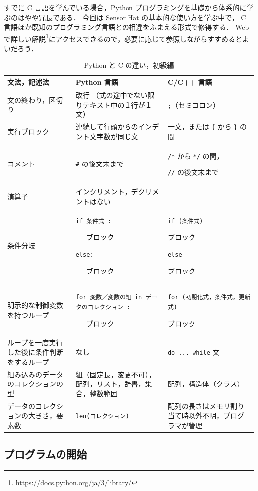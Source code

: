 \documentclass[11pt,a4,epsf]{report}
\begin{document}
すでに C 言語を学んでいる場合，Python プログラミングを基礎から体系的に学ぶのはやや冗長である．
今回は Sensor Hat の基本的な使い方を学ぶ中で， C 言語ほか既知のプログラミング言語との相違をふまえる形式で修得する．
Web で詳しい解説\footnote{\sf https://docs.python.org/ja/3/library/}にアクセスできるので，必要に応じて参照しながらすすめるとよいだろう．

\begin{table}[h]
\caption{Python と C の違い，初級編}
  \begin{tabular}{|p{1.5in}|p{2in}|p{2in}|}
\hline
文法，記述法 & Python 言語 & C/C++ 言語 \\
\hline
\hline
文の終わり，区切り & 改行 （式の途中でない限りテキスト中の１行が１文） & \verb+;+（セミコロン） \\
\hline
実行ブロック & 連続して行頭からのインデント文字数が同じ文 & 一文，または \verb+{+ から \verb+}+ の間\\
\hline
コメント & \verb+#+ の後文末まで & \verb+/*+ から \verb+*/+ の間，\par \verb+//+ の後文末まで \\
\hline
演算子 & インクリメント，デクリメントはない &  \\
\hline
条件分岐 & \verb+if 条件式 :+\par ~~~ブロック \par\verb+else:+ \par ~~~ブロック & \verb+if (条件式) +\par ブロック\par\verb+else+\par ブロック \\
\hline
明示的な制御変数を持つループ & \verb+for 変数／変数の組 in データのコレクション :+ \par ~~~ブロック& \verb+for (初期化式，条件式，更新式)+ \par ブロック \\
\hline
ループを一度実行した後に条件判断をするループ & なし & \verb+do ... while+ 文\\
\hline
組み込みのデータのコレクションの型 & 組（固定長，変更不可），配列，リスト，辞書，集合，整数範囲 & 配列，構造体（クラス）\\
\hline
データのコレクションの大きさ，要素数 & \verb+len(コレクション)+ & 配列の長さはメモリ割り当て時以外不明，プログラマが管理\\
\hline
  \end{tabular}
\end{table}

\subsection{プログラムの開始}
\end{document}
